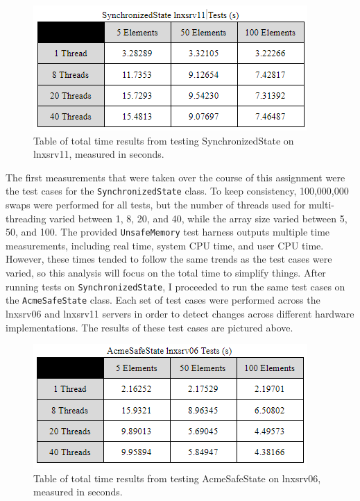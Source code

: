 \begin{figure}
  \includegraphics[scale=0.8]{./Assets/synchronized-11.png}
  \caption{\label{fig:vectors} Table of total time results from testing SynchronizedState on lnxsrv11, measured in seconds. }
\end{figure}

\par The first measurements that were taken over the course of this assignment were
the test cases for the \texttt{SynchronizedState} class. To keep consistency, 
100,000,000 swaps were performed for all tests, but the number of threads used 
for multi-threading varied between 1, 8, 20, and 40, while the array size varied 
between 5, 50, and 100. The provided \texttt{UnsafeMemory} test harness
outputs multiple time measurements, including real time, system CPU time, and user
CPU time. However, these times tended to follow the same trends as the test cases
were varied, so this analysis will focus on the total time to simplify things.
After running tests on \texttt{SynchronizedState}, I proceeded to run the same
test cases on the \texttt{AcmeSafeState} class. Each set of test cases were
performed across the lnxsrv06 and lnxsrv11 servers in order to detect changes
across different hardware implementations. The results of these test cases
are pictured above. 

\begin{figure}
  \includegraphics[scale=0.8]{./Assets/acmesafe-06.png}
  \caption{\label{fig:vectors} Table of total time results from testing AcmeSafeState on lnxsrv06, measured in seconds. }
\end{figure}

